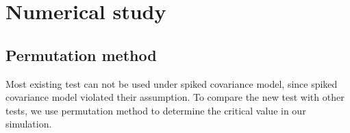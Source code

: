 \documentclass[12pt]{article} %
\DeclareMathOperator{\mytr}{tr}
\newcommand{\bX}{\mathbf{X}}
\newcommand{\bfsym}[1]{\ensuremath{\boldsymbol{#1}}}
\def\bSigma {\bfsym {\Sigma}}
\theoremstyle{definition}
\begin{document}





\section{Numerical study}

\subsection{Permutation method}
 Most existing test can not be used under spiked covariance model, since spiked covariance model violated their assumption.
 To compare the new test with other tests, we use permutation method to determine the critical value in our simulation.
 
\end{document}
